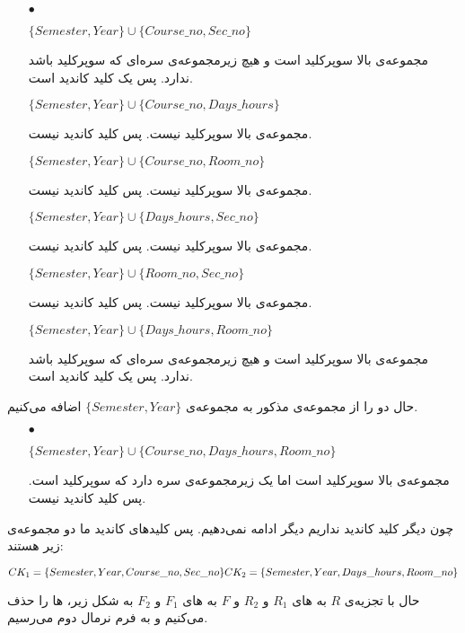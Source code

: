 \documentclass{article}
\begin{document}
\begin{itemize}
    \item [$\bullet$]
\begin{latin}
$
\{Semester, Year\}\cup\{Course\_no, Sec\_no\}
$
\end{latin}
مجموعه‌ی بالا سوپرکلید است و هیچ زیرمجموعه‌ی سره‌ای که سوپرکلید باشد ندارد. پس یک کلید کاندید است.
\begin{latin}
$
\{Semester, Year\}\cup\{Course\_no, Days\_hours\}
$
\end{latin}
مجموعه‌ی بالا سوپرکلید نیست. پس کلید کاندید نیست.
\begin{latin}
$
\{Semester, Year\}\cup\{Course\_no, Room\_no\}
$
\end{latin}
مجموعه‌ی بالا سوپرکلید نیست. پس کلید کاندید نیست.

\begin{latin}
$
\{Semester, Year\}\cup\{Days\_hours, Sec\_no\}
$
\end{latin}
مجموعه‌ی بالا سوپرکلید نیست. پس کلید کاندید نیست.

\begin{latin}
$
\{Semester, Year\}\cup\{Room\_no, Sec\_no\}
$
\end{latin}
مجموعه‌ی بالا سوپرکلید نیست. پس کلید کاندید نیست.
\begin{latin}
$
\{Semester, Year\}\cup\{Days\_hours, Room\_no\}
$
\end{latin}
مجموعه‌ی بالا سوپرکلید است و هیچ زیرمجموعه‌ی سره‌ای که سوپرکلید باشد ندارد. پس یک کلید کاندید است.
\end{itemize}

حال دو  را از مجموعه‌ی مذکور به مجموعه‌ی
$
\{Semester, Year\}
$
اضافه می‌کنیم.
\begin{itemize}
    \item [$\bullet$]
\begin{latin}
$
\{Semester, Year\}\cup\{Course\_no, Days\_hours, Room\_no\}
$
\end{latin}
مجموعه‌ی بالا سوپرکلید است اما یک زیرمجموعه‌ی سره دارد که سوپرکلید است. پس کلید کاندید نیست.
\end{itemize}
 چون دیگر کلید کاندید نداریم دیگر ادامه نمی‌دهیم. پس کلیدهای کاندید ما دو مجموعه‌ی زیر هستند:
\begin{latin}
$
\\CK_{1}=\{Semester, Year, Course\_no, Sec\_no\}\\
CK_{2}=\{Semester, Year, Days\_hours, Room\_no\}
$
\end{latin}
حال با تجزیه‌ی $R$ به های 
$R_{1}$ و $R_{2}$ 
و $F$ به های 
$F_{1}$ و $F_{2}$ 
به شکل زیر، ها را حذف می‌کنیم و به فرم نرمال دوم می‌رسیم.
\end{document}
